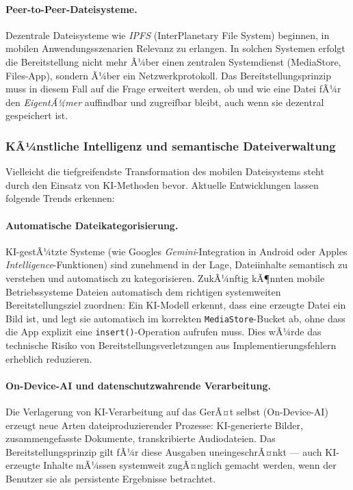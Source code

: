 ﻿\documentclass[12pt, a4paper]{article}
\begin{document}
\paragraph{Peer-to-Peer-Dateisysteme.}
Dezentrale Dateisysteme wie \emph{IPFS} (InterPlanetary File System) beginnen, in mobilen
Anwendungsszenarien Relevanz zu erlangen. In solchen Systemen erfolgt die Bereitstellung
nicht mehr Ã¼ber einen zentralen Systemdienst (MediaStore, Files-App), sondern Ã¼ber ein
Netzwerkprotokoll. Das Bereitstellungsprinzip muss in diesem Fall auf die Frage erweitert
werden, ob und wie eine Datei fÃ¼r den \emph{EigentÃ¼mer} auffindbar und zugreifbar bleibt,
auch wenn sie dezentral gespeichert ist.

\subsubsection{KÃ¼nstliche Intelligenz und semantische Dateiverwaltung}

Vielleicht die tiefgreifendste Transformation des mobilen Dateisystems steht durch den
Einsatz von KI-Methoden bevor. Aktuelle Entwicklungen lassen folgende Trends erkennen:

\paragraph{Automatische Dateikategorisierung.}
KI-gestÃ¼tzte Systeme (wie Googles \emph{Gemini}-Integration in Android oder Apples
\emph{Intelligence}-Funktionen) sind zunehmend in der Lage, Dateiinhalte semantisch zu
verstehen und automatisch zu kategorisieren. ZukÃ¼nftig kÃ¶nnten mobile Betriebssysteme
Dateien automatisch dem richtigen systemweiten Bereitstellungsziel zuordnen: Ein
KI-Modell erkennt, dass eine erzeugte Datei ein Bild ist, und legt sie automatisch im
korrekten \texttt{MediaStore}-Bucket ab, ohne dass die App explizit eine \texttt{insert()}-Operation
aufrufen muss. Dies wÃ¼rde das technische Risiko von Bereitstellungsverletzungen aus
Implementierungsfehlern erheblich reduzieren.

\paragraph{On-Device-AI und datenschutzwahrende Verarbeitung.}
Die Verlagerung von KI-Verarbeitung auf das GerÃ¤t selbst (On-Device-AI) erzeugt neue
Arten dateiproduzierender Prozesse: KI-generierte Bilder, zusammengefasste Dokumente,
transkribierte Audiodateien. Das Bereitstellungsprinzip gilt fÃ¼r diese Ausgaben
uneingeschrÃ¤nkt --- auch KI-erzeugte Inhalte mÃ¼ssen systemweit zugÃ¤nglich gemacht werden,
wenn der Benutzer sie als persistente Ergebnisse betrachtet.
\end{document}
